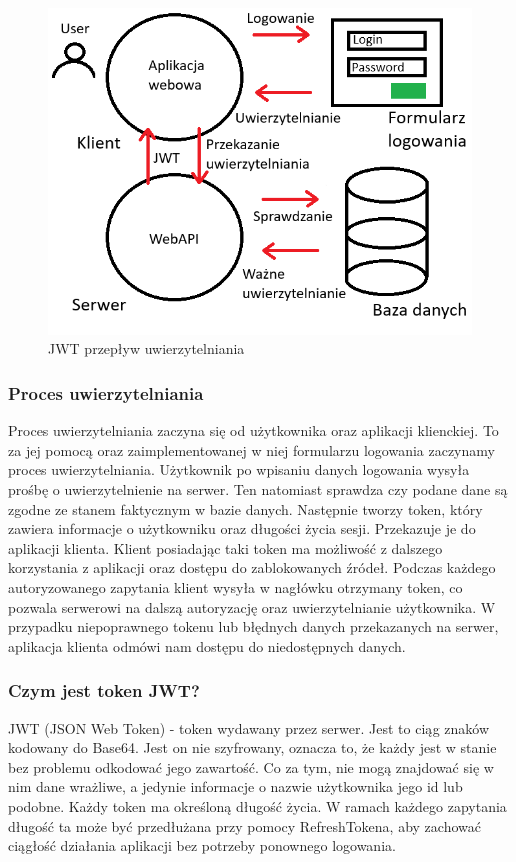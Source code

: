\documentclass[a4paper,twoside,12pt]{book}
\begin{document}
\begin{figure}[H]
    \centering
    \includegraphics[width=1\textwidth]{jwt.png}
    \caption{JWT przepływ uwierzytelniania}
    \label{JWT}
\end{figure}

\subsubsection{Proces uwierzytelniania} 
Proces uwierzytelniania zaczyna się od użytkownika oraz aplikacji klienckiej. To za jej pomocą oraz zaimplementowanej w niej formularzu logowania zaczynamy proces uwierzytelniania. Użytkownik po wpisaniu danych logowania wysyła prośbę o uwierzytelnienie na serwer. Ten natomiast sprawdza czy podane dane są zgodne ze stanem faktycznym w bazie danych. Następnie tworzy token, który zawiera informacje o użytkowniku oraz długości życia sesji. Przekazuje je do aplikacji klienta. Klient posiadając taki token ma możliwość z dalszego korzystania z aplikacji oraz dostępu do zablokowanych źródeł. Podczas każdego autoryzowanego zapytania klient wysyła w nagłówku otrzymany token, co pozwala serwerowi na dalszą autoryzację oraz uwierzytelnianie użytkownika. W przypadku niepoprawnego tokenu lub błędnych danych przekazanych na serwer, aplikacja klienta odmówi nam dostępu do niedostępnych danych. 

\subsubsection{Czym jest token JWT?} 
JWT (JSON Web Token) - token wydawany przez serwer. Jest to ciąg znaków kodowany do Base64. Jest on nie szyfrowany, oznacza to, że każdy jest w stanie bez problemu odkodować jego zawartość. Co za tym, nie mogą znajdować się w nim dane wrażliwe, a jedynie informacje o nazwie użytkownika jego id lub podobne. Każdy token ma określoną długość życia. W ramach każdego zapytania długość ta może być przedłużana przy pomocy RefreshTokena, aby zachować ciągłość działania aplikacji bez potrzeby ponownego logowania.  
\end{document}
